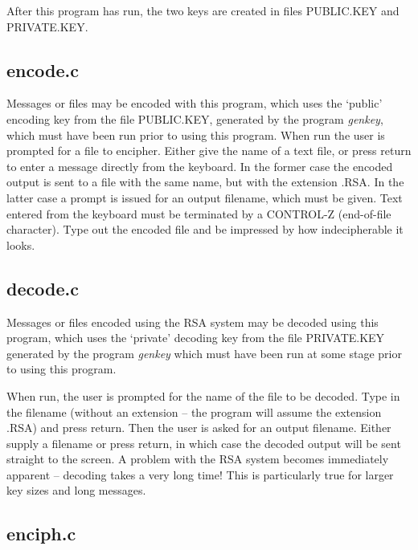      After  this  program  has  run,  the  two  keys  are created in files 
      PUBLIC.KEY and PRIVATE.KEY.  

      \subsection{encode.c}

      Messages or files may be encoded with this program,  which  uses  the 
      `public'  encoding  key  from  the file PUBLIC.KEY,  generated by the 
      program {\em genkey},  which must have  been  run  prior  to  using  this 
      program.  When run the user is  prompted  for  a  file  to  encipher.  
      Either  give  the  name  of  a text file,  or press return to enter a 
      message directly from the keyboard.  In the former case  the  encoded 
      output  is sent to a file with the same name,  but with the extension 
      .RSA.  In the latter case a prompt is issued for an  output  filename, 
      which  must  be  given.  Text  entered  from  the  keyboard  must  be 
      terminated by a CONTROL-Z (end-of-file character).  Type out the  encoded  file 
      and be impressed by how indecipherable it looks. 

      \subsection{decode.c}

      Messages or files encoded using the RSA system may be  decoded  using 
      this  program,  which  uses  the `private' decoding key from the file 
      PRIVATE.KEY generated by the program {\em genkey} which  must  have  been 
      run at some stage prior to using this program.  

      When  run,  the  user  is  prompted  for  the  name of the file to be 
      decoded.  Type in the filename (without an extension  -- the  program 
      will  assume  the extension .RSA) and press return.  Then the user is 
      asked for an output filename.  Either  supply  a  filename  or  press 
      return, in which case the decoded output will be sent straight to the 
      screen.  A problem with the RSA system becomes immediately apparent -- 
      decoding takes a very long time! This is particularly true for larger 
      key sizes and long messages.  

      \subsection{enciph.c}

